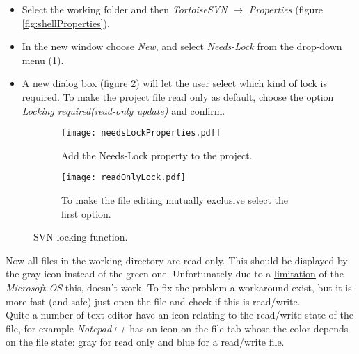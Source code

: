 \begin{itemize}

    \item Select the working folder and then \textit{TortoiseSVN} $\rightarrow$ \textit{Properties} (figure \ref{fig:shellProperties}).
    
    \item In the new window choose \textit{New}, and select \textit{Needs-Lock} from the drop-down menu (\ref{fig:needsLockProperties}).
    
    \item A new dialog box (figure \ref{fig:readOnlyLock}) will let the user select which kind of lock is required. To make the project file read only as default, choose the option \textit{Locking required(read-only update)} and confirm.
    
\end{itemize}




\begin{figure}[htbp]
\begin{subfigure}{0.5\textwidth}
  \centering
  \texttt{[image: needsLockProperties.pdf]}
  \caption{Add the Needs-Lock property to the project.}
  \label{fig:needsLockProperties}
\end{subfigure}%
\hspace{5mm}
\begin{subfigure}{0.5\textwidth}
  \centering
  \texttt{[image: readOnlyLock.pdf]}
  \caption{To make the file editing mutually exclusive select the first option.}
  \label{fig:readOnlyLock}
\end{subfigure}
\caption{SVN locking function.}
\label{fig:svnKeepLocks}
\end{figure}

Now all files in the working directory are read only. This should be displayed by the gray icon instead of the green one. Unfortunately due to a \href{http://tortoisesvn.tigris.org/faq.html#ovlnotall}{limitation} of the \textit{Microsoft OS} this, doesn't work. To fix the problem a workaround exist, but it is more fast (and safe) just open the file and check if this is read/write.\\

Quite a number of text editor have an icon relating to the read/write state of the file, for example \textit{Notepad++} has an icon on the file tab whose the color depends on the file state: gray for read only and blue for a read/write file.\newline


